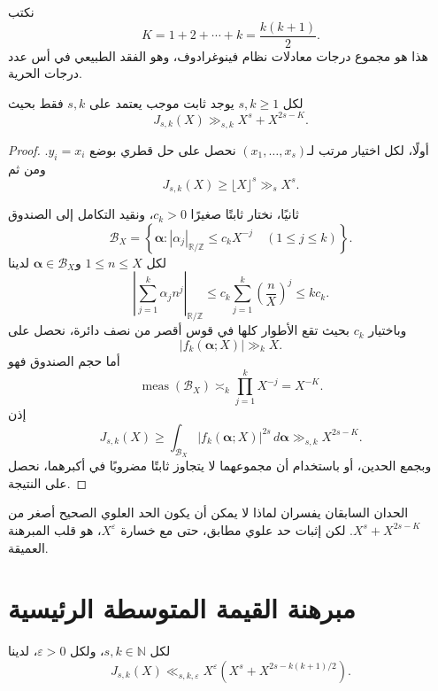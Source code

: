 \begin{definition}
\label{def:ch25-critical-weight}
\provedhere
نكتب
\[
K=1+2+\cdots+k=\frac{k(k+1)}2.
\]
هذا هو مجموع درجات معادلات نظام فينوغرادوف، وهو الفقد الطبيعي في أس عدد درجات الحرية.
\end{definition}

\begin{proposition}
\label{prop:ch25-structural-lower-bounds}
\provedhere
لكل \(s,k\ge1\) يوجد ثابت موجب يعتمد على \(s,k\) فقط بحيث
\[
J_{s,k}(X)
\gg_{s,k}
X^s+X^{2s-K}.
\]
\end{proposition}

\begin{proof}
أولًا، لكل اختيار مرتب لـ\((x_1,\ldots,x_s)\) نحصل على حل قطري بوضع \(y_i=x_i\). ومن ثم
\[
J_{s,k}(X)\ge \lfloor X\rfloor^s\gg_s X^s.
\]

ثانيًا، نختار ثابتًا صغيرًا \(c_k>0\)، ونقيد التكامل إلى الصندوق
\[
\mathcal B_X=
\left\{
\boldsymbol\alpha:
|\alpha_j|_{\mathbb R/\mathbb Z}
\le c_kX^{-j}
\quad(1\le j\le k)
\right\}.
\]
لكل \(1\le n\le X\) و\(\boldsymbol\alpha\in\mathcal B_X\) لدينا
\[
\left|
\sum_{j=1}^{k}\alpha_jn^j
\right|_{\mathbb R/\mathbb Z}
\le
c_k\sum_{j=1}^{k}\left(\frac nX\right)^j
\le kc_k.
\]
وباختيار \(c_k\) بحيث تقع الأطوار كلها في قوس أقصر من نصف دائرة، نحصل على
\[
|f_k(\boldsymbol\alpha;X)|\gg_k X.
\]
أما حجم الصندوق فهو
\[
\operatorname{meas}(\mathcal B_X)
\asymp_k
\prod_{j=1}^{k}X^{-j}
=X^{-K}.
\]
إذن
\[
J_{s,k}(X)
\ge
\int_{\mathcal B_X}|f_k(\boldsymbol\alpha;X)|^{2s}
\,d\boldsymbol\alpha
\gg_{s,k}X^{2s-K}.
\]
وبجمع الحدين، أو باستخدام أن مجموعهما لا يتجاوز ثابتًا مضروبًا في أكبرهما، نحصل على النتيجة.
\end{proof}

الحدان السابقان يفسران لماذا لا يمكن أن يكون الحد العلوي الصحيح أصغر من
\(X^s+X^{2s-K}\). لكن إثبات حد علوي مطابق، حتى مع خسارة \(X^\varepsilon\)، هو قلب المبرهنة العميقة.

\section{مبرهنة القيمة المتوسطة الرئيسية}

\begin{theorem}
\label{thm:ch25-main-vmvt}
لكل \(s,k\in\mathbb N\)، ولكل \(\varepsilon>0\)، لدينا
\[
J_{s,k}(X)
\ll_{s,k,\varepsilon}
X^\varepsilon
\left(
X^s+X^{2s-k(k+1)/2}
\right).
\]
\end{theorem}


